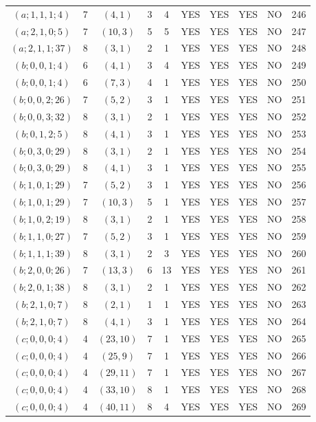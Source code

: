 \begin{longtable}{|c|c|c|c|c|c|c|c|c|c|}
$(a; 1, 1, 1; 4)$ & 7 & $(4, 1)$ & 3 & 4 & YES & YES & YES & NO & 246\\
$(a; 2, 1, 0; 5)$ & 7 & $(10, 3)$ & 5 & 5 & YES & YES & YES & NO & 247\\
$(a; 2, 1, 1; 37)$ & 8 & $(3, 1)$ & 2 & 1 & YES & YES & YES & NO & 248\\
$(b; 0, 0, 1; 4)$ & 6 & $(4, 1)$ & 3 & 4 & YES & YES & YES & NO & 249\\
$(b; 0, 0, 1; 4)$ & 6 & $(7, 3)$ & 4 & 1 & YES & YES & YES & NO & 250\\
$(b; 0, 0, 2; 26)$ & 7 & $(5, 2)$ & 3 & 1 & YES & YES & YES & NO & 251\\
$(b; 0, 0, 3; 32)$ & 8 & $(3, 1)$ & 2 & 1 & YES & YES & YES & NO & 252\\
$(b; 0, 1, 2; 5)$ & 8 & $(4, 1)$ & 3 & 1 & YES & YES & YES & NO & 253\\
$(b; 0, 3, 0; 29)$ & 8 & $(3, 1)$ & 2 & 1 & YES & YES & YES & NO & 254\\
$(b; 0, 3, 0; 29)$ & 8 & $(4, 1)$ & 3 & 1 & YES & YES & YES & NO & 255\\
$(b; 1, 0, 1; 29)$ & 7 & $(5, 2)$ & 3 & 1 & YES & YES & YES & NO & 256\\
$(b; 1, 0, 1; 29)$ & 7 & $(10, 3)$ & 5 & 1 & YES & YES & YES & NO & 257\\
$(b; 1, 0, 2; 19)$ & 8 & $(3, 1)$ & 2 & 1 & YES & YES & YES & NO & 258\\
$(b; 1, 1, 0; 27)$ & 7 & $(5, 2)$ & 3 & 1 & YES & YES & YES & NO & 259\\
$(b; 1, 1, 1; 39)$ & 8 & $(3, 1)$ & 2 & 3 & YES & YES & YES & NO & 260\\
$(b; 2, 0, 0; 26)$ & 7 & $(13, 3)$ & 6 & 13 & YES & YES & YES & NO & 261\\
$(b; 2, 0, 1; 38)$ & 8 & $(3, 1)$ & 2 & 1 & YES & YES & YES & NO & 262\\
$(b; 2, 1, 0; 7)$ & 8 & $(2, 1)$ & 1 & 1 & YES & YES & YES & NO & 263\\
$(b; 2, 1, 0; 7)$ & 8 & $(4, 1)$ & 3 & 1 & YES & YES & YES & NO & 264\\
$(c; 0, 0, 0; 4)$ & 4 & $(23, 10)$ & 7 & 1 & YES & YES & YES & NO & 265\\
$(c; 0, 0, 0; 4)$ & 4 & $(25, 9)$ & 7 & 1 & YES & YES & YES & NO & 266\\
$(c; 0, 0, 0; 4)$ & 4 & $(29, 11)$ & 7 & 1 & YES & YES & YES & NO & 267\\
$(c; 0, 0, 0; 4)$ & 4 & $(33, 10)$ & 8 & 1 & YES & YES & YES & NO & 268\\
$(c; 0, 0, 0; 4)$ & 4 & $(40, 11)$ & 8 & 4 & YES & YES & YES & NO & 269\\

\end{longtable}
